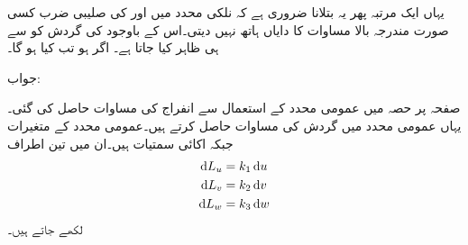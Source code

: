 یہاں ایک مرتبہ پھر یہ بتلانا ضروری ہے کہ نلکی محدد میں  اور  کی صلیبی ضرب کسی صورت مندرجہ بالا مساوات کا دایاں ہاتھ نہیں دیتی۔اس کے باوجود  کی  گردش کو  سے ہی ظاہر کیا جاتا ہے۔ 
اگر  ہو تب  کیا ہو گا۔

جواب:

صفحہ  پر حصہ  میں عمومی محدد کے استعمال سے انفراج کی مساوات حاصل کی گئی۔یہاں عمومی محدد میں گردش کی مساوات حاصل کرتے ہیں۔عمومی محدد کے متغیرات  جبکہ اکائی سمتیات  ہیں۔ان میں تین اطراف
\begin{align*}
\dif L_u &= k_1 \dif u \\
\dif L_v &= k_2 \dif v \\
\dif L_w &= k_3 \dif w 
\end{align*}
لکھے جاتے ہیں۔

